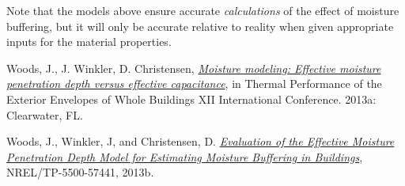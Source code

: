 Note that the models above ensure accurate \emph{calculations} of the effect of moisture buffering, but it will only be accurate relative to reality when given appropriate inputs for the material properties.

Woods, J., J. Winkler, D. Christensen, \href{http://www.techstreet.com/products/1868073}{\emph{Moisture modeling: Effective moisture penetration depth versus effective capacitance}}, in Thermal Performance of the Exterior Envelopes of Whole Buildings XII International Conference. 2013a: Clearwater, FL.

Woods, J., Winkler, J, and Christensen, D. \href{http://www.nrel.gov/docs/fy13osti/57441.pdf}{\emph{Evaluation of the Effective Moisture Penetration Depth Model for Estimating Moisture Buffering in Buildings}}, NREL/TP-5500-57441, 2013b.